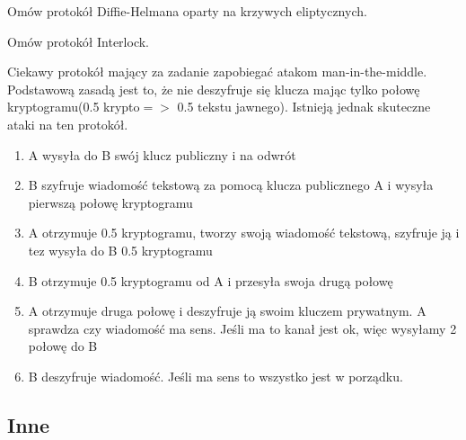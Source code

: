 \documentclass[answers,11pt]{exam}
\begin{document}
\begin{questions}
\question Omów protokół Diffie-Helmana oparty na krzywych eliptycznych.
\begin{solution}
\end{solution}

\question Omów protokół Interlock.
\begin{solution}
Ciekawy protokół mający za zadanie zapobiegać atakom man-in-the-middle. Podstawową zasadą jest to, że nie deszyfruje się klucza mając tylko połowę kryptogramu(0.5 krypto$=>$ 0.5 tekstu jawnego). Istnieją jednak skuteczne ataki na ten protokół.

\begin{enumerate}
\item A wysyła do B swój klucz publiczny i na odwrót
\item B szyfruje wiadomość tekstową za pomocą klucza publicznego A i wysyła pierwszą połowę kryptogramu
\item A otrzymuje 0.5 kryptogramu, tworzy swoją wiadomość tekstową, szyfruje ją i tez wysyła do B 0.5 kryptogramu
\item B otrzymuje 0.5 kryptogramu od A i przesyła swoja drugą połowę
\item A otrzymuje druga połowę i deszyfruje ją swoim kluczem prywatnym. A sprawdza czy wiadomość ma sens. Jeśli ma to kanał jest ok, więc wysyłamy 2 połowę do B
\item B deszyfruje wiadomość. Jeśli ma sens to wszystko jest w porządku.
\end{enumerate}

\end{solution}


\end{questions}


\subsection{Inne}
\end{document}
